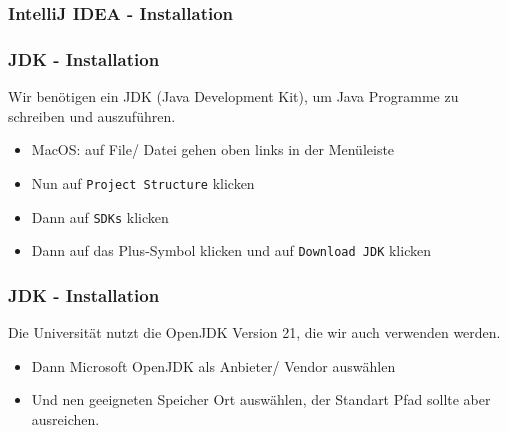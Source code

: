 \documentclass{../../presentation}
\begin{document}
\begin{frame}
  \frametitle{IntelliJ IDEA - Installation}
\end{frame}

\begin{frame}
  \frametitle{JDK - Installation}
  Wir benötigen ein JDK (Java Development Kit), um Java Programme zu schreiben und auszuführen.
  \newline
  \begin{itemize}
    \item \achtung{} MacOS: auf File/ Datei gehen oben links in der Menüleiste
    \item Nun auf \texttt{Project Structure} klicken
    \item Dann auf \texttt{SDKs} klicken
    \item Dann auf das Plus-Symbol klicken und auf \texttt{Download JDK} klicken
  \end{itemize}
\end{frame}

\begin{frame}
  \frametitle{JDK - Installation}
  \achtung{} Die Universität nutzt die OpenJDK Version 21, die wir auch verwenden werden.
  \begin{itemize}
    \item Dann Microsoft OpenJDK als Anbieter/ Vendor auswählen
    \item Und nen geeigneten Speicher Ort auswählen, der Standart Pfad sollte aber ausreichen.
  \end{itemize}
\end{frame}
\end{document}
